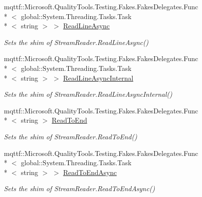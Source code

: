 \begin{DoxyCompactItemize}
mqttf\-::\-Microsoft.\-Quality\-Tools.\-Testing.\-Fakes.\-Fakes\-Delegates.\-Func\\*
$<$ global\-::\-System.\-Threading.\-Tasks.\-Task\\*
$<$ string $>$ $>$ \hyperlink{class_system_1_1_i_o_1_1_fakes_1_1_shim_stream_reader_a55b881f43b92e1a211989c4f0721ddd3}{Read\-Line\-Async}
\begin{DoxyCompactList}\small\item\em Sets the shim of Stream\-Reader.\-Read\-Line\-Async()\end{DoxyCompactList}\item 
mqttf\-::\-Microsoft.\-Quality\-Tools.\-Testing.\-Fakes.\-Fakes\-Delegates.\-Func\\*
$<$ global\-::\-System.\-Threading.\-Tasks.\-Task\\*
$<$ string $>$ $>$ \hyperlink{class_system_1_1_i_o_1_1_fakes_1_1_shim_stream_reader_a0c96ac8a2009be03615d94cb996ad97f}{Read\-Line\-Async\-Internal}
\begin{DoxyCompactList}\small\item\em Sets the shim of Stream\-Reader.\-Read\-Line\-Async\-Internal()\end{DoxyCompactList}\item 
mqttf\-::\-Microsoft.\-Quality\-Tools.\-Testing.\-Fakes.\-Fakes\-Delegates.\-Func\\*
$<$ string $>$ \hyperlink{class_system_1_1_i_o_1_1_fakes_1_1_shim_stream_reader_a9ee18356e50153a59737ff2d23a05edc}{Read\-To\-End}
\begin{DoxyCompactList}\small\item\em Sets the shim of Stream\-Reader.\-Read\-To\-End()\end{DoxyCompactList}\item 
mqttf\-::\-Microsoft.\-Quality\-Tools.\-Testing.\-Fakes.\-Fakes\-Delegates.\-Func\\*
$<$ global\-::\-System.\-Threading.\-Tasks.\-Task\\*
$<$ string $>$ $>$ \hyperlink{class_system_1_1_i_o_1_1_fakes_1_1_shim_stream_reader_a69b9624df78dc3ebda74bfa6261df762}{Read\-To\-End\-Async}
\begin{DoxyCompactList}\small\item\em Sets the shim of Stream\-Reader.\-Read\-To\-End\-Async()\end{DoxyCompactList}\item 

\end{DoxyCompactItemize}
